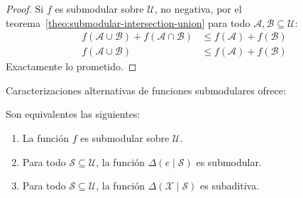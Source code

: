   \begin{proof}
    Si \(f\) es submodular sobre \(\mathscr{U}\),
    no negativa,
    por el teorema~\ref{theo:submodular-intersection-union}
    para todo \(\mathscr{A}, \mathscr{B} \subseteq \mathscr{U}\):
    \begin{align*}
      f(\mathscr{A} \cup \mathscr{B}) + f(\mathscr{A} \cap \mathscr{B})
        &\le f(\mathscr{A}) + f(\mathscr{B}) \\
      f(\mathscr{A} \cup \mathscr{B})
        &\le f(\mathscr{A}) + f(\mathscr{B})
    \end{align*}
    Exactamente lo prometido.
  \end{proof}
  Caracterizaciones alternativas de funciones submodulares
  ofrece:
  \begin{theorem}
    \label{theo:submodular-equivalent}
    Son equivalentes las siguientes:
    \begin{enumerate}[label = \roman*, ref = (\roman*)]
    \item
      \label{item:f-submodular}
      La función \(f\) es submodular sobre \(\mathscr{U}\).
    \item
      \label{item:marginal-submodular}
      Para todo \(\mathscr{S} \subseteq \mathscr{U}\),
      la función \(\Delta(e \mid \mathscr{S})\) es submodular.
    \item
      \label{item:marginal-subadditive}
      Para todo \(\mathscr{S} \subseteq \mathscr{U}\),
      la función \(\Delta(\mathscr{X} \mid \mathscr{S})\) es subaditiva.
    \end{enumerate}
  \end{theorem}
